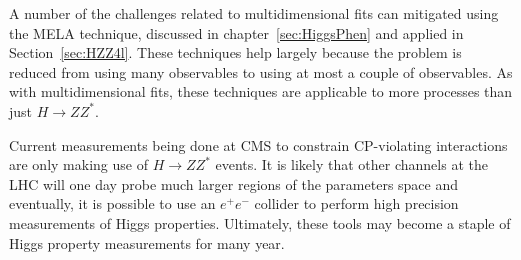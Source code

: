 A number of the challenges related to multidimensional fits
can mitigated using the MELA
technique, discussed in chapter~\ref{sec:HiggsPhen} and applied
in Section~\ref{sec:HZZ4l}.  These techniques
help largely because the problem is reduced from using
many observables to using at most a couple of observables.  As 
with multidimensional fits,
these techniques are applicable to more processes than just 
$H\to ZZ^*$.  

Current measurements being done at CMS to constrain 
CP-violating interactions are only making use of $H\to ZZ^*$
events.  It is
likely that other channels at the LHC will one day probe much
larger regions of the parameters space and eventually, it is 
possible to use an $e^+e^-$ collider to perform high precision
measurements of Higgs properties.  Ultimately, 
these tools may become a staple of Higgs property measurements
for many year.




